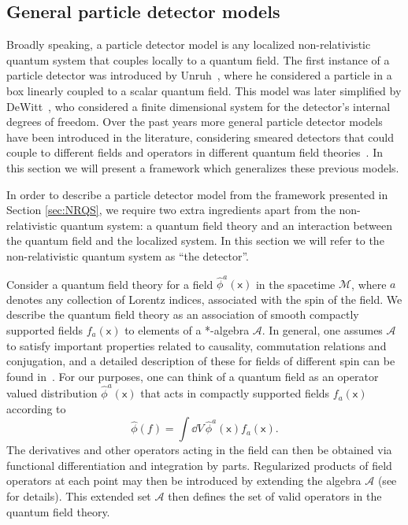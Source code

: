 \documentclass[prd,twocolumn,superscriptaddress,floatfix,amsmath,amssymb,amsfonts,longbibliography,nofootinbib]{revtex4-1}
\newcommand{\mf}{\mathsf}%
\begin{document}
\subsection{General particle detector models}\label{sub:generalPDs}

Broadly speaking, a particle detector model is any localized non-relativistic quantum system that couples locally to a quantum field. The first instance of a particle detector was introduced by Unruh~\cite{Unruh1976}, where he considered a particle in a box linearly coupled to a scalar quantum field. This model was later simplified by DeWitt~\cite{DeWitt}, who considered a finite dimensional system for the detector's internal degrees of freedom. Over the past years more general particle detector models have been introduced in the literature, considering smeared detectors that could couple to different fields and operators in different quantum field theories~\cite{Takagi,Sachs1,sachs2018entanglement,eduAchimBosonFermion,Pozas-Kerstjens:2015,Nicho1,richard,mine}. In this section we will present a framework which generalizes these previous models.

In order to describe a particle detector model from the framework presented in Section \ref{sec:NRQS}, we require two extra ingredients apart from the non-relativistic quantum system: a quantum field theory and an interaction between the quantum field and the localized system. In this section we will refer to the non-relativistic quantum system as ``the detector''.

Consider a quantum field theory for a field $\hat{\phi}^a(\mf x)$ in the spacetime $\mathcal{M}$, where $a$ denotes any collection of Lorentz indices, associated with the spin of the field. We describe the quantum field theory as an association of smooth compactly supported fields $f_a(\mf x)$ to elements of a *-algebra $\mathcal{A}$. In general, one assumes $\mathcal{A}$ to satisfy important properties related to causality, commutation relations and conjugation, and a detailed description of these for fields of different spin can be found in~\cite{aqft}. For our purposes, one can think of a quantum field as an operator valued distribution $\hat{\phi}^a(\mf x)$ that acts in compactly supported fields $f_a(\mf x)$ according to
\begin{equation}
    \hat{\phi}(f) = \int \dd V\, \hat{\phi}^a(\mf x) f_a(\mf x).
\end{equation}
The derivatives and other operators acting in the field can then be obtained via functional differentiation and integration by parts. Regularized products of field operators at each point may then be introduced by extending the algebra $\mathcal{A}$ (see~\cite{Khavkine2015} for details). This extended set $\mathcal{A}$ then defines the set of valid operators in the quantum field theory.
\end{document}
